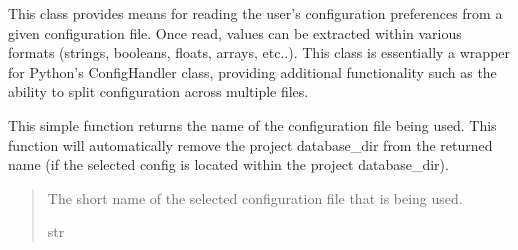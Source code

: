 \documentclass[letterpaper,10pt,english]{sphinxmanual}
\begin{document}
\begin{fulllineitems}
\label{\detokenize{modules/input/config_handler:qnav.input.config_handler.ConfigHandler}}
\pysigstartsignatures
{}
\pysigstopsignatures
\sphinxAtStartPar
This class provides means for reading the user’s configuration preferences
from a given configuration file. Once read, values can be extracted within
various formats (strings, booleans, floats, arrays, etc..). This class is
essentially a wrapper for Python’s ConfigHandler class, providing
additional functionality such as the ability to split configuration
across multiple files.

\begin{fulllineitems}
\label{\detokenize{modules/input/config_handler:qnav.input.config_handler.ConfigHandler.get_config_name}}
\pysigstartsignatures
{}
\pysigstopsignatures
\sphinxAtStartPar
This simple function returns the name of the configuration file being
used. This function will automatically remove the project database\_dir
from the returned name (if the selected config is located within the
project database\_dir).
\begin{quote}\begin{description}
\sphinxAtStartPar
The short name of the selected configuration file that is
being used.

\sphinxAtStartPar
str

\end{description}\end{quote}

\end{fulllineitems}



\end{fulllineitems}
\end{document}
